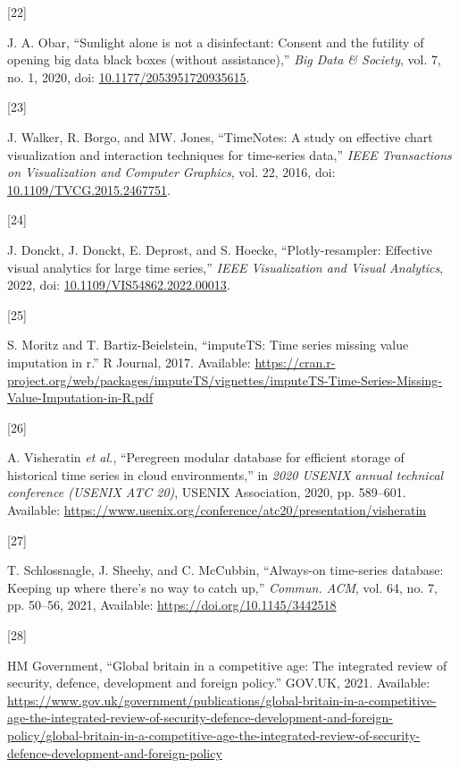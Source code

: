 \documentclass{article}
\newlength{\cslhangindent}
\newlength{\csllabelwidth}
\newlength{\cslentryspacingunit} %
\newenvironment{CSLReferences}[2] %
 {%
  \setlength{\parindent}{0pt}
  \ifodd #1
  \let\oldpar\par
  \def\par{\hangindent=\cslhangindent\oldpar}
  \fi
  \setlength{\parskip}{#2\cslentryspacingunit}
 }%
 {}
\newcommand{\CSLLeftMargin}[1]{\parbox[t]{\csllabelwidth}{#1}}
\newcommand{\CSLRightInline}[1]{\parbox[t]{\linewidth - \csllabelwidth}{#1}\break}
\begin{document}
\begin{CSLReferences}{0}{0}
\leavevmode{}%
\CSLLeftMargin{{[}22{]} }%
\CSLRightInline{J. A. Obar, {``Sunlight alone is not a disinfectant:
Consent and the futility of opening big data black boxes (without
assistance),''} \emph{Big Data \& Society}, vol. 7, no. 1, 2020, doi:
\href{https://doi.org/10.1177/2053951720935615}{10.1177/2053951720935615}.}

\leavevmode{}%
\CSLLeftMargin{{[}23{]} }%
\CSLRightInline{J. Walker, R. Borgo, and MW. Jones, {``TimeNotes: A
study on effective chart visualization and interaction techniques for
time-series data,''} \emph{IEEE Transactions on Visualization and
Computer Graphics}, vol. 22, 2016, doi:
\href{https://doi.org/10.1109/TVCG.2015.2467751}{10.1109/TVCG.2015.2467751}.}

\leavevmode{}%
\CSLLeftMargin{{[}24{]} }%
\CSLRightInline{J. Donckt, J. Donckt, E. Deprost, and S. Hoecke,
{``Plotly-resampler: Effective visual analytics for large time
series,''} \emph{IEEE Visualization and Visual Analytics}, 2022, doi:
\href{https://doi.org/10.1109/VIS54862.2022.00013}{10.1109/VIS54862.2022.00013}.}

\leavevmode{}%
\CSLLeftMargin{{[}25{]} }%
\CSLRightInline{S. Moritz and T. Bartiz-Beielstein, {``imputeTS: Time
series missing value imputation in r.''} R Journal, 2017. Available:
\url{https://cran.r-project.org/web/packages/imputeTS/vignettes/imputeTS-Time-Series-Missing-Value-Imputation-in-R.pdf}}

\leavevmode{}%
\CSLLeftMargin{{[}26{]} }%
\CSLRightInline{A. Visheratin \emph{et al.}, {``Peregreen {\textendash}
modular database for efficient storage of historical time series in
cloud environments,''} in \emph{2020 USENIX annual technical conference
(USENIX ATC 20)}, USENIX Association, 2020, pp. 589--601. Available:
\url{https://www.usenix.org/conference/atc20/presentation/visheratin}}

\leavevmode{}%
\CSLLeftMargin{{[}27{]} }%
\CSLRightInline{T. Schlossnagle, J. Sheehy, and C. McCubbin,
{``Always-on time-series database: Keeping up where there's no way to
catch up,''} \emph{Commun. ACM}, vol. 64, no. 7, pp. 50--56, 2021,
Available: \url{https://doi.org/10.1145/3442518}}

\leavevmode{}%
\CSLLeftMargin{{[}28{]} }%
\CSLRightInline{HM Government, {``Global britain in a competitive age:
The integrated review of security, defence, development and foreign
policy.''} GOV.UK, 2021. Available:
\url{https://www.gov.uk/government/publications/global-britain-in-a-competitive-age-the-integrated-review-of-security-defence-development-and-foreign-policy/global-britain-in-a-competitive-age-the-integrated-review-of-security-defence-development-and-foreign-policy}}


\end{CSLReferences}
\end{document}
